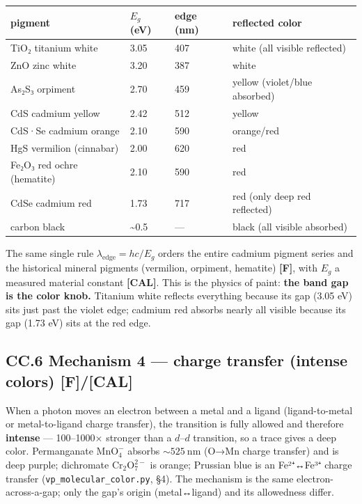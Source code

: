 \documentclass[
  10pt,
]{article}
\begin{document}
\begin{longtable}[]{@{}llll@{}}
\toprule\noalign{}
pigment & \(E_g\) (eV) & edge (nm) & reflected color \\
\midrule\noalign{}
\endhead
\bottomrule\noalign{}
\endlastfoot
TiO₂ titanium white & 3.05 & 407 & white (all visible reflected) \\
ZnO zinc white & 3.20 & 387 & white \\
As₂S₃ orpiment & 2.70 & 459 & yellow (violet/blue absorbed) \\
CdS cadmium yellow & 2.42 & 512 & yellow \\
CdS·Se cadmium orange & 2.10 & 590 & orange/red \\
HgS vermilion (cinnabar) & 2.00 & 620 & red \\
Fe₂O₃ red ochre (hematite) & 2.10 & 590 & red \\
CdSe cadmium red & 1.73 & 717 & red (only deep red reflected) \\
carbon black & \textasciitilde0.5 & --- & black (all visible
absorbed) \\
\end{longtable}

The same single rule \(\lambda_{\text{edge}} = hc/E_g\) orders the
entire cadmium pigment series and the historical mineral pigments
(vermilion, orpiment, hematite) \textbf{{[}F{]}}, with \(E_g\) a
measured material constant \textbf{{[}CAL{]}}. This is the physics of
paint: \textbf{the band gap is the color knob.} Titanium white reflects
everything because its gap (3.05 eV) sits just past the violet edge;
cadmium red absorbs nearly all visible because its gap (1.73 eV) sits at
the red edge.

\hypertarget{cc.6-mechanism-4-charge-transfer-intense-colors-fcal}{%
\subsection{\texorpdfstring{CC.6 Mechanism 4 --- charge transfer
(intense colors)
\textbf{{[}F{]}/{[}CAL{]}}}{CC.6 Mechanism 4 --- charge transfer (intense colors) {[}F{]}/{[}CAL{]}}}\label{cc.6-mechanism-4-charge-transfer-intense-colors-fcal}}

When a photon moves an electron between a metal and a ligand
(ligand-to-metal or metal-to-ligand charge transfer), the transition is
fully allowed and therefore \textbf{intense} --- 100--1000× stronger
than a \(d\)--\(d\) transition, so a trace gives a deep color.
Permanganate \(\mathrm{MnO_4^-}\) absorbs \(\sim 525\ \mathrm{nm}\)
(O→Mn charge transfer) and is deep purple; dichromate
\(\mathrm{Cr_2O_7^{2-}}\) is orange; Prussian blue is an Fe²⁺↔Fe³⁺
charge transfer (\texttt{vp\_molecular\_color.py}, §4). The mechanism is
the same electron-across-a-gap; only the gap's origin (metal↔ligand) and
its allowedness differ.
\end{document}
